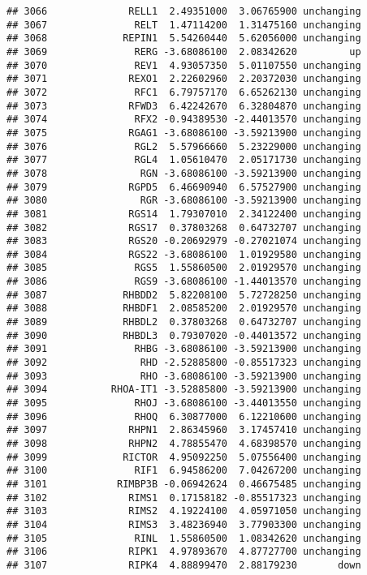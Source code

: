 \documentclass[]{article}
\begin{document}
\begin{verbatim}
## 3066              RELL1  2.49351000  3.06765900 unchanging
## 3067               RELT  1.47114200  1.31475160 unchanging
## 3068             REPIN1  5.54260440  5.62056000 unchanging
## 3069               RERG -3.68086100  2.08342620         up
## 3070               REV1  4.93057350  5.01107550 unchanging
## 3071              REXO1  2.22602960  2.20372030 unchanging
## 3072               RFC1  6.79757170  6.65262130 unchanging
## 3073              RFWD3  6.42242670  6.32804870 unchanging
## 3074               RFX2 -0.94389530 -2.44013570 unchanging
## 3075              RGAG1 -3.68086100 -3.59213900 unchanging
## 3076               RGL2  5.57966660  5.23229000 unchanging
## 3077               RGL4  1.05610470  2.05171730 unchanging
## 3078                RGN -3.68086100 -3.59213900 unchanging
## 3079              RGPD5  6.46690940  6.57527900 unchanging
## 3080                RGR -3.68086100 -3.59213900 unchanging
## 3081              RGS14  1.79307010  2.34122400 unchanging
## 3082              RGS17  0.37803268  0.64732707 unchanging
## 3083              RGS20 -0.20692979 -0.27021074 unchanging
## 3084              RGS22 -3.68086100  1.01929580 unchanging
## 3085               RGS5  1.55860500  2.01929570 unchanging
## 3086               RGS9 -3.68086100 -1.44013570 unchanging
## 3087             RHBDD2  5.82208100  5.72728250 unchanging
## 3088             RHBDF1  2.08585200  2.01929570 unchanging
## 3089             RHBDL2  0.37803268  0.64732707 unchanging
## 3090             RHBDL3  0.79307020 -0.44013572 unchanging
## 3091               RHBG -3.68086100 -3.59213900 unchanging
## 3092                RHD -2.52885800 -0.85517323 unchanging
## 3093                RHO -3.68086100 -3.59213900 unchanging
## 3094           RHOA-IT1 -3.52885800 -3.59213900 unchanging
## 3095               RHOJ -3.68086100 -3.44013550 unchanging
## 3096               RHOQ  6.30877000  6.12210600 unchanging
## 3097              RHPN1  2.86345960  3.17457410 unchanging
## 3098              RHPN2  4.78855470  4.68398570 unchanging
## 3099             RICTOR  4.95092250  5.07556400 unchanging
## 3100               RIF1  6.94586200  7.04267200 unchanging
## 3101            RIMBP3B -0.06942624  0.46675485 unchanging
## 3102              RIMS1  0.17158182 -0.85517323 unchanging
## 3103              RIMS2  4.19224100  4.05971050 unchanging
## 3104              RIMS3  3.48236940  3.77903300 unchanging
## 3105               RINL  1.55860500  1.08342620 unchanging
## 3106              RIPK1  4.97893670  4.87727700 unchanging
## 3107              RIPK4  4.88899470  2.88179230       down

\end{verbatim}
\end{document}
